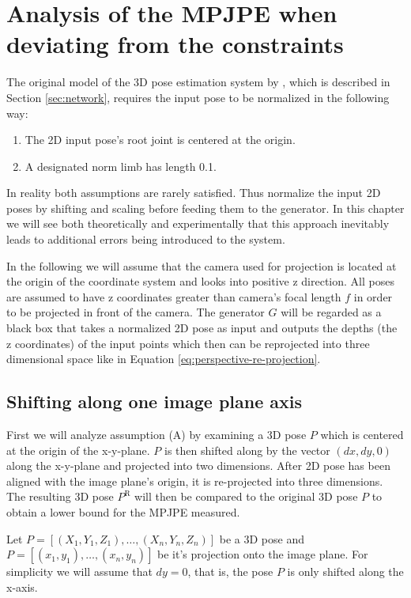 \section{Analysis of the MPJPE when deviating from the constraints}

The original model of the 3D pose estimation system by \citet{drover18}, which is described in Section \ref{sec:network}, requires the input pose to be normalized in the following way:
\begin{enumerate}[label=(\Alph*)]
	\item The 2D input pose's root joint is centered at the origin.
	\item A designated norm limb has length 0.1.
\end{enumerate}

In reality both assumptions are rarely satisfied.
Thus \citet{drover18} normalize the input 2D poses by shifting and scaling before feeding them to the generator.
In this chapter we will see both theoretically and experimentally that this approach inevitably leads to additional errors being introduced to the system.

In the following we will assume that the camera used for projection is located at the origin of the coordinate system and looks into positive z direction.
All poses are assumed to have z coordinates greater than camera's focal length $f$ in order to be projected in front of the camera.
The generator $G$ will be regarded as a black box that takes a normalized 2D pose as input and outputs the depths (the z coordinates) of the input points which then can be reprojected into three dimensional space like in Equation \eqref{eq:perspective-re-projection}.

\subsection{Shifting along one image plane axis}
\label{sec:x-shift-error}
First we will analyze assumption (A) by examining a 3D pose $P$ which is centered at the origin of the x-y-plane.
$P$ is then shifted along by the vector $(dx, dy, 0)$ along the x-y-plane and projected into two dimensions.
After 2D pose has been aligned with the image plane's origin, it is re-projected into three dimensions.
The resulting 3D pose $P^\mathrm{R}$ will then be compared to the original 3D pose $P$ to obtain a lower bound for the MPJPE measured.

Let $P= [(X_1, Y_1, Z_1), \dotsc, (X_n, Y_n, Z_n)]$ be a 3D pose and $P = [(x_1, y_1), \dotsc, (x_n, y_n)]$ be it's projection onto the image plane.
For simplicity we will assume that $dy = 0$, that is, the pose $P$ is only shifted along the x-axis.

